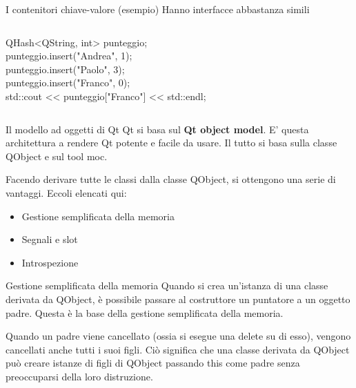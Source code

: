 \documentclass[10pt, aspectratio=169]{beamer}
\begin{document}
\begin{frame}{I contenitori chiave-valore (esempio)}
Hanno interfacce abbastanza simili
\bigskip
\begin{columns}
	\begin{block}{}
		{\ttfamily QHash<QString, int> punteggio;\\
			punteggio.insert("Andrea", 1);\\
			punteggio.insert("Paolo", 3);\\
			punteggio.insert("Franco", 0);\\
			std::cout << punteggio["Franco"] << std::endl;}
	\end{block}
\end{columns}
\end{frame}

\begin{frame}{Il modello ad oggetti di Qt}
	Qt si basa sul \textbf{Qt object model}. E' questa architettura a rendere Qt potente e facile da usare. Il tutto si basa sulla classe {\ttfamily QObject} e sul tool {\ttfamily moc}.
	
	Facendo derivare tutte le classi dalla classe {\ttfamily QObject}, si ottengono una serie di vantaggi. Eccoli elencati qui:
	
	\begin{itemize}
		\item Gestione semplificata della memoria
		\item Segnali e slot
		\item Introspezione
	\end{itemize}
\end{frame}

\begin{frame}{Gestione semplificata della memoria}
	Quando si crea un'istanza di una classe derivata da {\ttfamily QObject}, è possibile passare al costruttore un puntatore a un oggetto padre. Questa è la base della gestione semplificata della memoria.
	
	\bigskip
	Quando un padre viene cancellato (ossia si esegue una {\ttfamily delete} su di esso), vengono cancellati anche tutti i suoi figli. Ciò significa che una classe derivata da {\ttfamily QObject} può creare istanze di figli di {\ttfamily QObject} passando {\ttfamily this} come padre senza preoccuparsi della loro distruzione.
\end{frame}
\end{document}
